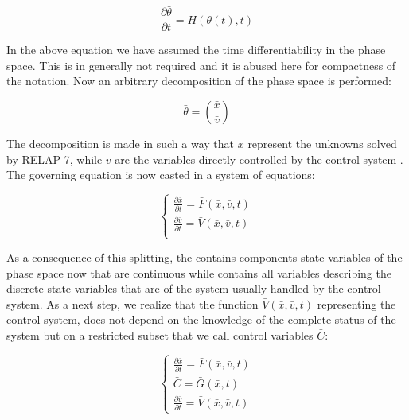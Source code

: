 \documentclass{mc2013}
\begin{document}
\begin{equation}
\frac{\partial \bar{\theta}}{\partial t} = \bar{H}(\theta(t),t)
\label{eq:SystemDynamics}
\end{equation}

In the above equation we have assumed the time differentiability in the phase space. This is in generally
not required and it is abused here for compactness of the notation. Now an arbitrary decomposition of the
phase space is performed:

\begin{equation}
\bar{\theta}=\binom{\bar{x}}{\bar{v}}
\label{eq:firstDecomposition}
\end{equation}

The decomposition is made in such a way that $x$ represent the unknowns solved by RELAP-7, while $v$ are the variables directly controlled by the control system . The governing equation is now casted in a system of equations:

\begin{equation}
\begin{cases} 
\frac{\partial \bar{x}}{\partial t} = \bar{F}(\bar{x},\bar{v},t) \\ 
\frac{\partial \bar{v}}{\partial t} = \bar{V}(\bar{x},\bar{v},t) \\
\end{cases}
\label{eq:generalSystemEquation}
\end{equation}

As a consequence of this splitting, the contains components state variables of the phase space now that
are continuous while contains all variables describing the discrete state variables that are of the system
usually handled by the control system. As a next step, we realize that the function 
$\bar{V}(\bar{x},\bar{v},t)$ 
representing the control system, does not depend on the knowledge of the complete status of the system but on a restricted subset that we call control variables $\bar{C}$:

\begin{equation}
\begin{cases} 
\frac{\partial \bar{x}}{\partial t} = \bar{F}(\bar{x},\bar{v},t) \\
\bar{C} = \bar{G}(\bar{x},t) \\ 
\frac{\partial \bar{v}}{\partial t} = \bar{V}(\bar{x},\bar{v},t) 
\end{cases}
\label{eq:generalSystemEquationwithControl}
\end{equation}
\end{document}
